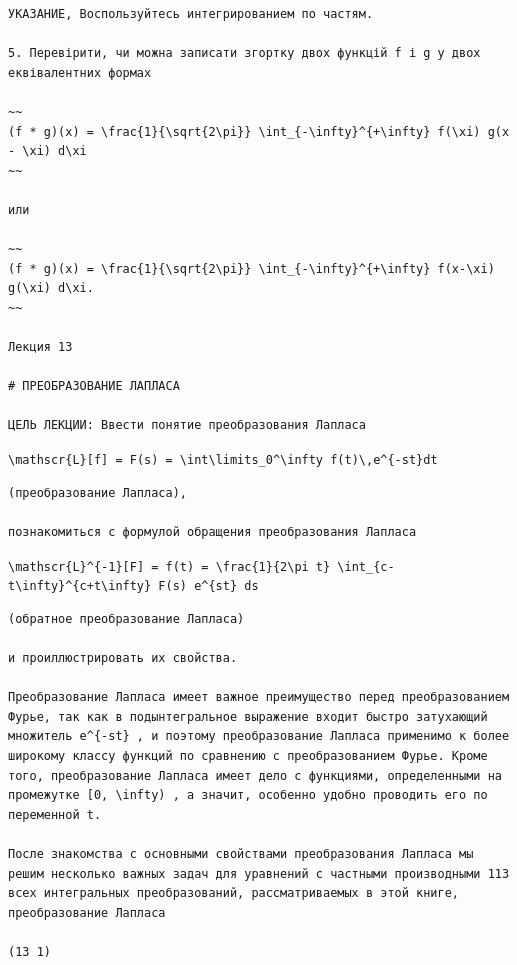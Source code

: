 \documentclass[
  ukrainian,
]{article}
\begin{document}
\begin{verbatim}
УКАЗАНИЕ, Воспользуйтесь интегрированием по частям.

5. Перевірити, чи можна записати згортку двох функцій f і g у двох еквівалентних формах

~~
(f * g)(x) = \frac{1}{\sqrt{2\pi}} \int_{-\infty}^{+\infty} f(\xi) g(x - \xi) d\xi
~~

или

~~
(f * g)(x) = \frac{1}{\sqrt{2\pi}} \int_{-\infty}^{+\infty} f(x-\xi) g(\xi) d\xi.
~~

Лекция 13

# ПРЕОБРАЗОВАНИЕ ЛАПЛАСА

ЦЕЛЬ ЛЕКЦИИ: Ввести понятие преобразования Лапласа
\end{verbatim}

\texttt{\textbackslash{}mathscr\{L\}{[}f{]}\ =\ F(s)\ =\ \textbackslash{}int\textbackslash{}limits\_0\^{}\textbackslash{}infty\ f(t)\textbackslash{},e\^{}\{-st\}dt}

\begin{verbatim}
(преобразование Лапласа),

познакомиться с формулой обращения преобразования Лапласа
\end{verbatim}

\texttt{\textbackslash{}mathscr\{L\}\^{}\{-1\}{[}F{]}\ =\ f(t)\ =\ \textbackslash{}frac\{1\}\{2\textbackslash{}pi\ t\}\ \textbackslash{}int\_\{c-t\textbackslash{}infty\}\^{}\{c+t\textbackslash{}infty\}\ F(s)\ e\^{}\{st\}\ ds}

\begin{verbatim}
(обратное преобразование Лапласа)

и проиллюстрировать их свойства.

Преобразование Лапласа имеет важное преимущество перед преобразованием Фурье, так как в подынтегральное выражение входит быстро затухающий множитель e^{-st} , и поэтому преобразование Лапласа применимо к более широкому классу функций по сравнению с преобразованием Фурье. Кроме того, преобразование Лапласа имеет дело с функциями, определенными на промежутке [0, \infty) , а значит, особенно удобно проводить его по переменной t.

После знакомства с основными свойствами преобразования Лапласа мы решим несколько важных задач для уравнений с частными производными 113 всех интегральных преобразований, рассматриваемых в этой книге, преобразование Лапласа

(13 1)
\end{verbatim}
\end{document}
